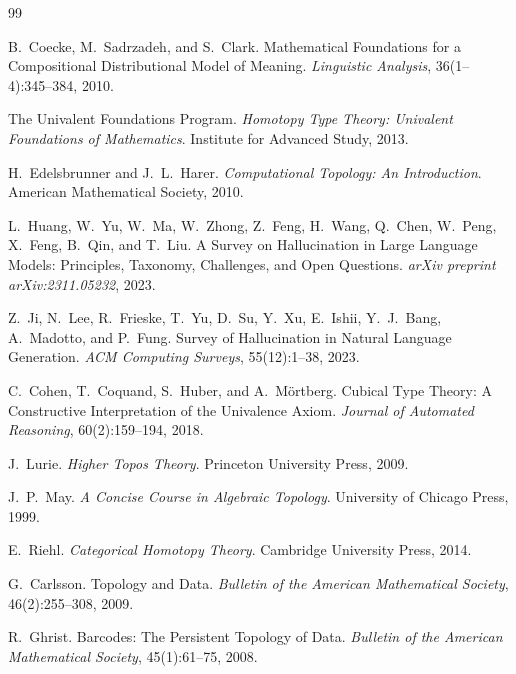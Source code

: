 \documentclass[11pt,a4paper]{article}
\theoremstyle{plain}
\theoremstyle{definition}
\theoremstyle{remark}
\begin{document}
\begin{thebibliography}{99}

B.~Coecke, M.~Sadrzadeh, and S.~Clark.
\newblock Mathematical Foundations for a Compositional Distributional Model of Meaning.
\newblock \emph{Linguistic Analysis}, 36(1--4):345--384, 2010.

The Univalent Foundations Program.
\newblock \emph{Homotopy Type Theory: Univalent Foundations of Mathematics}.
\newblock Institute for Advanced Study, 2013.

H.~Edelsbrunner and J.~L.~Harer.
\newblock \emph{Computational Topology: An Introduction}.
\newblock American Mathematical Society, 2010.

L.~Huang, W.~Yu, W.~Ma, W.~Zhong, Z.~Feng, H.~Wang, Q.~Chen, W.~Peng, X.~Feng, B.~Qin, and T.~Liu.
\newblock A Survey on Hallucination in Large Language Models: Principles, Taxonomy, Challenges, and Open Questions.
\newblock \emph{arXiv preprint arXiv:2311.05232}, 2023.

Z.~Ji, N.~Lee, R.~Frieske, T.~Yu, D.~Su, Y.~Xu, E.~Ishii, Y.~J.~Bang, A.~Madotto, and P.~Fung.
\newblock Survey of Hallucination in Natural Language Generation.
\newblock \emph{ACM Computing Surveys}, 55(12):1--38, 2023.

C.~Cohen, T.~Coquand, S.~Huber, and A.~M\"{o}rtberg.
\newblock Cubical Type Theory: A Constructive Interpretation of the Univalence Axiom.
\newblock \emph{Journal of Automated Reasoning}, 60(2):159--194, 2018.

J.~Lurie.
\newblock \emph{Higher Topos Theory}.
\newblock Princeton University Press, 2009.

J.~P.~May.
\newblock \emph{A Concise Course in Algebraic Topology}.
\newblock University of Chicago Press, 1999.

E.~Riehl.
\newblock \emph{Categorical Homotopy Theory}.
\newblock Cambridge University Press, 2014.

G.~Carlsson.
\newblock Topology and Data.
\newblock \emph{Bulletin of the American Mathematical Society}, 46(2):255--308, 2009.

R.~Ghrist.
\newblock Barcodes: The Persistent Topology of Data.
\newblock \emph{Bulletin of the American Mathematical Society}, 45(1):61--75, 2008.


\end{thebibliography}
\end{document}
